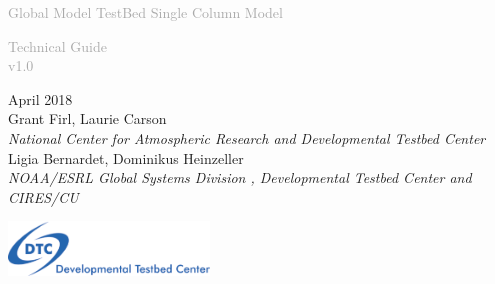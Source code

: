 \begin{titlepage}
\renewcommand{\thefootnote}{\fnsymbol{footnote}}

\vspace*{1em}
\noindent

\begin{center}
\textcolor{darkgray}{\bigsf Global Model TestBed Single Column Model\\}
\vspace*{1em}\par

\textcolor{darkgray}{\bigst Technical Guide \\v1.0}
\vspace*{1em}\par

\large{April 2018}\\[4em]

Grant Firl, Laurie Carson\\
\textit{\small{National Center for Atmospheric Research and Developmental Testbed Center}}\\[4em]

Ligia Bernardet, Dominikus Heinzeller\\
\textit{\small{NOAA/ESRL Global Systems Division , Developmental Testbed Center and CIRES/CU}}\\[4em]

\vspace{4em}

\includegraphics[width=0.4\textwidth]{images/dtc_logo.png}\\[2em]

\end{center}
\end{titlepage}
\pagebreak{}




